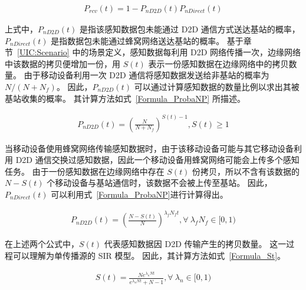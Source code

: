 \vspace{-1em}
\begin{equation}
  \label{Formula_ProbaRcvT}
  \begin{aligned}
    P_{rcv}(t) = 1 - P_{nD2D}(t) P_{nDirect}(t)
  \end{aligned}
\end{equation}

上式中，$P_{nD2D}(t)$ 是指该感知数据包未能通过 D2D 通信方式送达基站的概率，$P_{nDirect}(t)$ 是指数据包未能通过蜂窝网络送达基站的概率。
基于章节~\ref{UIC:Scenario} 中的场景定义，感知数据每利用 D2D 网络传播一次，边缘网络中该数据的拷贝便增加一份，用 $S(t)$ 表示一份感知数据在边缘网络中的拷贝数量。
由于移动设备利用一次 D2D 通信将感知数据发送给非基站的概率为 $N/(N + N_f)$。
因此，$P_{nD2D}(t)$ 可以通过计算感知数据的数量比例以求出其被基站收集的概率。
其计算方法如式~\eqref{Formula_ProbaNP} 所描述。

\begin{equation}
  \label{Formula_ProbaNP}
  \begin{aligned}
  P_{nD2D}(t) = (\frac{N}{N + N_f})^{S(t) - 1}, S(t) \geq 1
  \end{aligned}
\end{equation}

当移动设备使用蜂窝网络传输感知数据时，由于该移动设备可能与其它移动设备利用 D2D 通信交换过感知数据，因此一个移动设备用蜂窝网络可能会上传多个感知任务。
由于一份感知数据在边缘网络中存在 $S(t)$ 份拷贝，所以不含有该数据的 $N - S(t)$ 个移动设备与基站通信时，该数据不会被上传至基站。
因此，$P_{nDirect}(t)$ 可以利用式~\eqref{Formula_ProbaNP}进行计算得出。

\begin{equation}
  \label{Formula_ProbaNA}
  \begin{aligned}
  P_{nD2D}(t) = (\frac{N-S(t)}{N})^{\lambda_f N_f t}, \forall \ \lambda_f N_f \in [0,1)
  \end{aligned}
\end{equation}

在上述两个公式中，$S(t)$ 代表感知数据因 D2D 传输产生的拷贝数量。
这一过程可以理解为单传播源的 SIR 模型。
因此，其计算方法如式~\eqref{Formula_St}。

\begin{equation}
\label{Formula_St}
  \begin{aligned}
    S(t) = \frac{N e^{\lambda_n N t}}{e^{\lambda_n N t} + N -1}, \forall \ \lambda_n \in [0,1)
  \end{aligned}
\end{equation}


